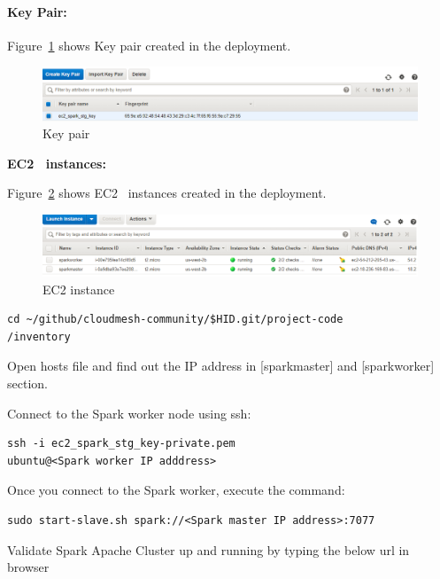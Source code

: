 \paragraph{Key Pair:}

Figure~\ref{f:key-pair} shows Key pair created in the deployment.

\begin{figure}[!ht]
	\centering\includegraphics[width=\columnwidth]{images/keypair.png}
	\caption{Key pair}\label{f:key-pair}
\end{figure}

\textbf{EC2~\cite{hid-sp18-511-www-ec2} instances:}

Figure~\ref{f:ec2-instance} shows EC2~\cite{hid-sp18-511-www-ec2}
instances created in the deployment.

\begin{figure}[!ht]
	\centering\includegraphics[width=\columnwidth]{images/ec2instances.png}
	\caption{EC2 instance}\label{f:ec2-instance}
\end{figure}


\begin{verbatim}
cd ~/github/cloudmesh-community/$HID.git/project-code
/inventory
\end{verbatim}

Open hosts file and find out the IP address in [sparkmaster] and
[sparkworker] section.

Connect to the Spark worker node using ssh:

\begin{verbatim}
ssh -i ec2_spark_stg_key-private.pem 
ubuntu@<Spark worker IP adddress>
\end{verbatim}

Once you connect to the Spark worker, execute the command:

\begin{verbatim}
sudo start-slave.sh spark://<Spark master IP address>:7077
\end{verbatim}

Validate Spark Apache Cluster up and running by typing the below url
in browser

